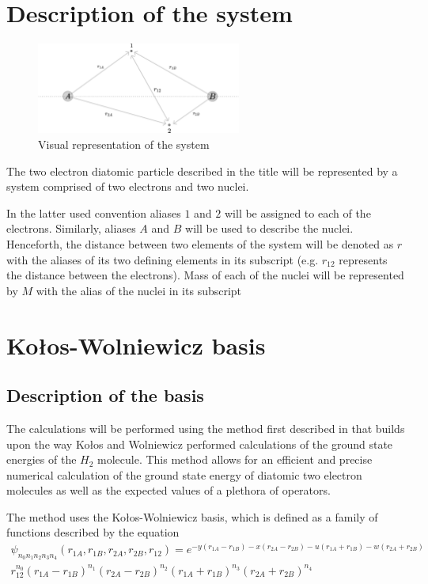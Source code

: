 \documentclass{pracalicmgr}
\begin{document}
\section{Description of the system}

\begin{figure}[H]
    \center
    \includegraphics[width=0.6\textwidth]{system.pdf}
    \caption{Visual representation of the system}
    \label{system}
\end{figure}

The two electron diatomic particle described in the title will be represented by a system comprised of two electrons and two nuclei.

In the latter used convention aliases $1$ and $2$ will be assigned to each of the electrons. Similarly, aliases $A$ and $B$ will be used to describe the nuclei. Henceforth, the distance between two elements of the system will be denoted as $r$ with the aliases of its two defining elements in its subscript (e.g. $r_{12}$ represents the distance between the electrons). Mass of each of the nuclei will be represented by $M$ with the alias of the nuclei in its subscript

\section{Kołos-Wolniewicz basis}

\subsection{Description of the basis}

The calculations will be performed using the method first described in \cite{metoda} that builds upon the way Kołos and Wolniewicz \cite{Kolos1} \cite{Kolos2} performed calculations of the ground state energies of the $H_2$ molecule. This method allows for an efficient and precise numerical calculation of the ground state energy of diatomic two electron molecules as well as the expected values of a plethora of operators.

The method uses the Kołos-Wolniewicz basis, which is  defined as a family of functions described by the equation
\begin{multline}
    \psi_{n_0 n_1 n_2 n_3 n_4} \left( r_{1A}, r_{1B}, r_{2A}, r_{2B}, r_{12} \right) = e^{-y\left(r_{1A}-r_{1B}\right)-x\left(r_{2A}-r_{2B}\right)-u\left(r_{1A}+r_{1B}\right)-w\left(r_{2A}+r_{2B}\right)}\\
    r_{12}^{n_0}{\left(r_{1A}-r_{1B}\right)}^{n_1}{\left(r_{2A}-r_{2B}\right)}^{n_2}{\left(r_{1A}+r_{1B}\right)}^{n_3}{\left(r_{2A}+r_{2B}\right)}^{n_4}
    \label{KWdef}
\end{multline}
\end{document}
